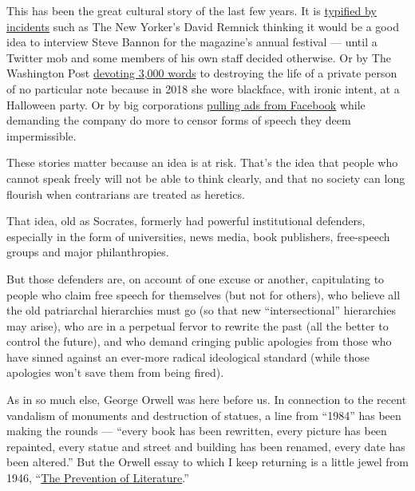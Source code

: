 This has been the great cultural story of the last few years. It is
\href{https://www.nytimes3xbfgragh.onion/2018/09/04/opinion/bannon-new-yorker-festival-remnick.html}{typified
by incidents} such as The New Yorker's David Remnick thinking it would
be a good idea to interview Steve Bannon for the magazine's annual
festival --- until a Twitter mob and some members of his own staff
decided otherwise. Or by The Washington Post
\href{https://www.washingtonpost.com/local/social-issues/blackface-incident-at-washington-post-cartoonists-2018-halloween-party-resurfaces-amid-protests/2020/06/17/66f09bde-af2e-11ea-856d-5054296735e5_story.html}{devoting
3,000 words} to destroying the life of a private person of no particular
note because in 2018 she wore blackface, with ironic intent, at a
Halloween party. Or by big corporations
\href{https://www.nytimes3xbfgragh.onion/2020/06/26/business/media/Facebook-advertising-boycott.html}{pulling
ads from Facebook} while demanding the company do more to censor forms
of speech they deem impermissible.

These stories matter because an idea is at risk. That's the idea that
people who cannot speak freely will not be able to think clearly, and
that no society can long flourish when contrarians are treated as
heretics.

That idea, old as Socrates, formerly had powerful institutional
defenders, especially in the form of universities, news media, book
publishers, free-speech groups and major philanthropies.

But those defenders are, on account of one excuse or another,
capitulating to people who claim free speech for themselves (but not for
others), who believe all the old patriarchal hierarchies must go (so
that new ``intersectional'' hierarchies may arise), who are in a
perpetual fervor to rewrite the past (all the better to control the
future), and who demand cringing public apologies from those who have
sinned against an ever-more radical ideological standard (while those
apologies won't save them from being fired).

As in so much else, George Orwell was here before us. In connection to
the recent vandalism of monuments and destruction of statues, a line
from ``1984'' has been making the rounds --- ``every book has been
rewritten, every picture has been repainted, every statue and street and
building has been renamed, every date has been altered.'' But the Orwell
essay to which I keep returning is a little jewel from 1946,
``\href{https://www.orwellfoundation.com/the-orwell-foundation/orwell/essays-and-other-works/the-prevention-of-literature/}{The
Prevention of Literature}.''

